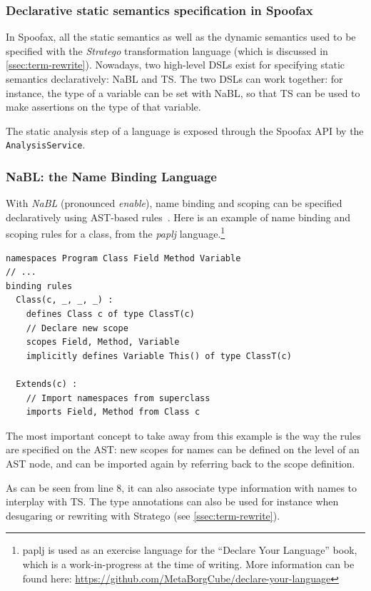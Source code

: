 \subsubsection{Declarative static semantics specification in Spoofax}
\label{ssec:orgheadline3}
In Spoofax, all the static semantics as well as the dynamic semantics
used to be specified with the \emph{Stratego} transformation language
(which is discussed in \cref{ssec:term-rewrite}). Nowadays, two
high-level DSLs exist for specifying static semantics declaratively:
NaBL and TS. The two DSLs can work together: for instance, the type of
a variable can be set with NaBL, so that TS can be used to make
assertions on the type of that variable.

The static analysis step of a language is exposed through the Spoofax
API by the \texttt{AnalysisService}.

\subsubsection{NaBL: the Name Binding Language}
\label{ssec:nabl}
With \emph{NaBL} (pronounced \emph{enable}), name binding and scoping can be
specified declaratively using AST-based
rules~\cite{KonatKWV12}. Here is an example of name binding
and scoping rules for a class, from the \emph{paplj}
language.\footnote{paplj is used as an exercise language for the
``Declare Your Language'' book, which is a work-in-progress at the time
of writing. More information can be found here:
\url{https://github.com/MetaBorgCube/declare-your-language}}
\lstset{language=nabl,numbers=left}
\begin{lstlisting}
namespaces Program Class Field Method Variable
// ...
binding rules
  Class(c, _, _, _) :
    defines Class c of type ClassT(c)
    // Declare new scope
    scopes Field, Method, Variable
    implicitly defines Variable This() of type ClassT(c)

  Extends(c) :
    // Import namespaces from superclass
    imports Field, Method from Class c
\end{lstlisting}
The most important concept to take away from this example is the way
the rules are specified on the AST: new scopes for names can be
defined on the level of an AST node, and can be imported again by
referring back to the scope definition.

As can be seen from line 8, it can also associate type information
with names to interplay with TS. The type annotations can also be used
for instance when desugaring or rewriting with Stratego (see \cref{ssec:term-rewrite}).

